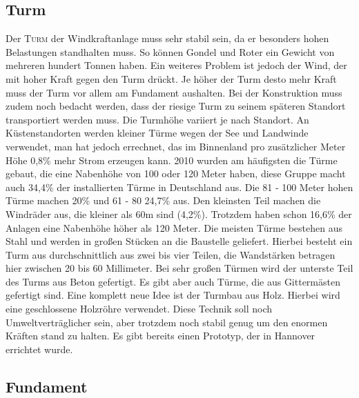 \documentclass[12pt]{scrbook}
\begin{document}
\newpage

\subsection{Turm}

Der \textsc{Turm} der Windkraftanlage muss sehr stabil sein, da er besonders hohen
Belastungen standhalten muss. So können Gondel und Roter ein Gewicht von
mehreren hundert Tonnen haben. Ein weiteres Problem ist jedoch der Wind, der
mit hoher Kraft gegen den Turm drückt. Je höher der Turm desto mehr Kraft muss
der Turm vor allem am Fundament aushalten. Bei der Konstruktion muss zudem
noch bedacht werden, dass der riesige Turm  zu seinem späteren Standort
transportiert werden muss. Die Turmhöhe variiert je nach Standort. An
Küstenstandorten werden kleiner Türme wegen der See und Landwinde verwendet,
man hat jedoch errechnet, das im Binnenland pro zusätzlicher Meter Höhe 0,8\%
mehr Strom erzeugen kann. 2010 wurden am häufigsten die Türme gebaut, die eine
Nabenhöhe von 100 oder 120 Meter haben, diese Gruppe macht auch 34,4\% der
installierten Türme in Deutschland aus. Die 81 - 100 Meter hohen Türme machen
20\% und 61 - 80 24,7\% aus. Den kleinsten Teil machen die Windräder aus, die
kleiner als 60m sind (4,2\%). Trotzdem haben schon 16,6\% der Anlagen eine
Nabenhöhe höher als 120 Meter. Die meisten Türme bestehen aus Stahl und werden
in großen Stücken an die Baustelle geliefert. Hierbei besteht ein Turm aus
durchschnittlich aus zwei bis vier Teilen, die Wandstärken betragen hier
zwischen 20 bis 60 Millimeter. Bei sehr großen Türmen wird der unterste Teil
des Turms aus Beton gefertigt. Es gibt aber auch Türme, die aus Gittermästen
gefertigt sind. Eine komplett neue Idee ist der Turmbau aus Holz. Hierbei wird
eine geschlossene Holzröhre verwendet. Diese Technik soll noch
Umweltverträglicher sein, aber trotzdem noch stabil genug um den enormen
Kräften stand zu halten. Es gibt bereits einen Prototyp, der in Hannover
errichtet wurde.

\subsection{Fundament}
\end{document}
